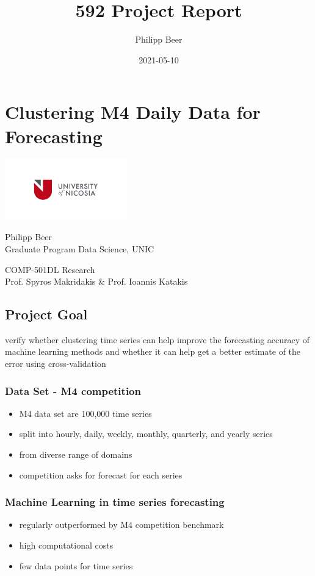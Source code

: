 \documentclass[11pt]{article}
\author{Philipp Beer}
\date{2021-05-10}
\title{592 Project Report}
\begin{document}
\maketitle


\section*{Clustering M4 Daily Data for Forecasting}
\label{sec:org4d6db5b}
\begin{center}
\includegraphics[width=200px]{./img/unic_logo.png}
\end{center}

Philipp Beer\\
Graduate Program Data Science, UNIC

COMP-501DL Research\\
Prof. Spyros Makridakis \& Prof. Ioannis Katakis\\
\subsection*{Project Goal}
\label{sec:org56839c4}
verify whether clustering time series can help improve the forecasting accuracy of machine learning methods and whether it can help get a better estimate of the error using cross-validation
\subsubsection*{Data Set - M4 competition}
\label{sec:orgba64349}
\begin{itemize}
\item M4 data set are  100,000 time series
\item split into hourly, daily, weekly, monthly, quarterly, and yearly series
\item from diverse range of domains
\item competition asks for forecast for each series
\end{itemize}

\subsubsection*{Machine Learning in time series forecasting}
\label{sec:org3826819}
\begin{itemize}
\item regularly outperformed by M4 competition benchmark
\item high computational costs
\item few data points for time series
\end{itemize}
\end{document}
